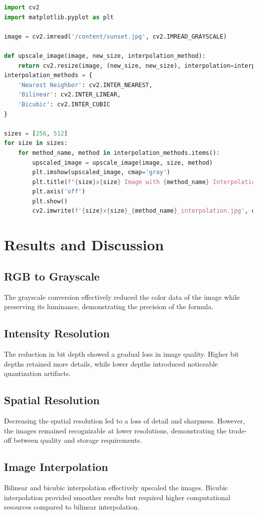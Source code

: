 \documentclass{report}
\begin{document}
\begin{lstlisting}[language=Python, caption=Image Interpolation, label=code:interpolation]
import cv2
import matplotlib.pyplot as plt

image = cv2.imread('/content/sunset.jpg', cv2.IMREAD_GRAYSCALE)

def upscale_image(image, new_size, interpolation_method):
    return cv2.resize(image, (new_size, new_size), interpolation=interpolation_method)
interpolation_methods = {
    'Nearest Neighbor': cv2.INTER_NEAREST,
    'Bilinear': cv2.INTER_LINEAR,
    'Bicubic': cv2.INTER_CUBIC
}

sizes = [256, 512]
for size in sizes:
    for method_name, method in interpolation_methods.items():
        upscaled_image = upscale_image(image, size, method)
        plt.imshow(upscaled_image, cmap='gray')
        plt.title(f"{size}x{size} Image with {method_name} Interpolation")
        plt.axis('off')
        plt.show()
        cv2.imwrite(f'{size}x{size}_{method_name}_interpolation.jpg', upscaled_image)
\end{lstlisting}

\section{Results and Discussion}
\subsection{RGB to Grayscale}
The grayscale conversion effectively reduced the color data of the image while preserving its luminance, demonstrating the precision of the formula.

\subsection{Intensity Resolution}
The reduction in bit depth showed a gradual loss in image quality. Higher bit depths retained more details, while lower depths introduced noticeable quantization artifacts.

\subsection{Spatial Resolution}
Decreasing the spatial resolution led to a loss of detail and sharpness. However, the images remained recognizable at lower resolutions, demonstrating the trade-off between quality and storage requirements.

\subsection{Image Interpolation}
Bilinear and bicubic interpolation effectively upscaled the images. Bicubic interpolation provided smoother results but required higher computational resources compared to bilinear interpolation.
\end{document}
